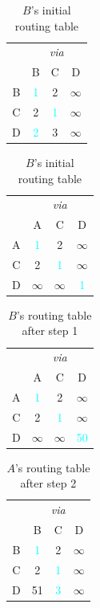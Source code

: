 \documentclass[12pt,a4paper]{article}
\begin{document}
\begin{table}[!ht]
\begin{minipage}{0.5\textwidth}
\centering
\begin{tabular}{c|ccc}
	& \multicolumn{3}{c}{\textit{via}} 						\\
	&	B			&	C			&	D					\\
\hline
B	& 	\textcolor{Cyan}{1}	&	2			&	$\infty$	\\
C	&	2			&	\textcolor{Cyan}{1}	&	$\infty$	\\
D	&	\textcolor{Cyan}{2}	&	3			&	$\infty$	\\
\end{tabular}
\caption{$A$'s initial routing table}
\label{tab:inita}
\end{minipage}
\hfill
\begin{minipage}{0.5\textwidth}
\centering
\begin{tabular}{c|ccc}
	& \multicolumn{3}{c}{\textit{via}} 						\\
	&	A			&	C			&	D					\\
\hline
A	& 	\textcolor{Cyan}{1}	&	2			&	$\infty$	\\
C	&	2			&	\textcolor{Cyan}{1}	&	$\infty$	\\
D	&	$\infty$	&	$\infty$	&	\textcolor{Cyan}{1}	\\
\end{tabular}
\caption{$B$'s initial routing table}
\label{tab:initb}
\end{minipage}
\end{table}

\begin{table}[!ht]
\centering
\begin{tabular}{c|ccc}
	& \multicolumn{3}{c}{\textit{via}} 						\\
	&	A			&	C			&	D					\\
\hline
A	& 	\textcolor{Cyan}{1}	&	2			&	$\infty$	\\
C	&	2			&	\textcolor{Cyan}{1}	&	$\infty$	\\
D	&	$\infty$	&	$\infty$	&	\textcolor{Cyan}{50}\\
\end{tabular}
\caption{$B$'s routing table after step 1}
\label{tab:step1}
\end{table}

\begin{table}[!ht]
\centering
\begin{tabular}{c|ccc}
	& \multicolumn{3}{c}{\textit{via}} 						\\
	&	B			&	C			&	D					\\
\hline
B	& 	\textcolor{Cyan}{1}	&	2			&	$\infty$	\\
C	&	2			&	\textcolor{Cyan}{1}	&	$\infty$	\\
D	&	51			&	\textcolor{Cyan}{3}	&	$\infty$	\\
\end{tabular}
\caption{$A$'s routing table after step 2}
\label{tab:step2}
\end{table}
\end{document}
